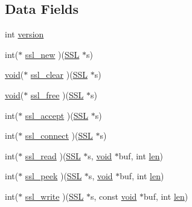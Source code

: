 \subsection*{Data Fields}
\begin{DoxyCompactItemize}
\item 
int \hyperlink{structssl__method__st_aad880fc4455c253781e8968f2239d56f}{version}
\item 
int($\ast$ \hyperlink{structssl__method__st_af01b1a29fdeb66e611dca725caecdfcd}{ssl\+\_\+new} )(\hyperlink{crypto_2ossl__typ_8h_a71f21e09bf365489dab9d85bd4785e24}{S\+SL} $\ast$s)
\item 
\hyperlink{hw__4758__cca_8h_afad4d591c7931ff6dc5bf69c76c96aa0}{void}($\ast$ \hyperlink{structssl__method__st_a8dc478efd0c1ebad9a7da93c749168af}{ssl\+\_\+clear} )(\hyperlink{crypto_2ossl__typ_8h_a71f21e09bf365489dab9d85bd4785e24}{S\+SL} $\ast$s)
\item 
\hyperlink{hw__4758__cca_8h_afad4d591c7931ff6dc5bf69c76c96aa0}{void}($\ast$ \hyperlink{structssl__method__st_a1041c3805ac6cba5adaf5c4cc34e7b6e}{ssl\+\_\+free} )(\hyperlink{crypto_2ossl__typ_8h_a71f21e09bf365489dab9d85bd4785e24}{S\+SL} $\ast$s)
\item 
int($\ast$ \hyperlink{structssl__method__st_ae3e4f0a3a9378f4f26312e12318c476f}{ssl\+\_\+accept} )(\hyperlink{crypto_2ossl__typ_8h_a71f21e09bf365489dab9d85bd4785e24}{S\+SL} $\ast$s)
\item 
int($\ast$ \hyperlink{structssl__method__st_ab1428f6ea062364ac8b5e3ef46037539}{ssl\+\_\+connect} )(\hyperlink{crypto_2ossl__typ_8h_a71f21e09bf365489dab9d85bd4785e24}{S\+SL} $\ast$s)
\item 
int($\ast$ \hyperlink{structssl__method__st_a08b6155a38ff9a92d129ee5714fcc106}{ssl\+\_\+read} )(\hyperlink{crypto_2ossl__typ_8h_a71f21e09bf365489dab9d85bd4785e24}{S\+SL} $\ast$s, \hyperlink{hw__4758__cca_8h_afad4d591c7931ff6dc5bf69c76c96aa0}{void} $\ast$buf, int \hyperlink{include_2openssl_2x509_8h_ad8c3db4434e9cb5cd772cc009f40e856}{len})
\item 
int($\ast$ \hyperlink{structssl__method__st_ae0f55e38529bb5894dcec9ff19e9b04d}{ssl\+\_\+peek} )(\hyperlink{crypto_2ossl__typ_8h_a71f21e09bf365489dab9d85bd4785e24}{S\+SL} $\ast$s, \hyperlink{hw__4758__cca_8h_afad4d591c7931ff6dc5bf69c76c96aa0}{void} $\ast$buf, int \hyperlink{include_2openssl_2x509_8h_ad8c3db4434e9cb5cd772cc009f40e856}{len})
\item 
int($\ast$ \hyperlink{structssl__method__st_a7d53f3c773121d96d1653052bf263f84}{ssl\+\_\+write} )(\hyperlink{crypto_2ossl__typ_8h_a71f21e09bf365489dab9d85bd4785e24}{S\+SL} $\ast$s, const \hyperlink{hw__4758__cca_8h_afad4d591c7931ff6dc5bf69c76c96aa0}{void} $\ast$buf, int \hyperlink{include_2openssl_2x509_8h_ad8c3db4434e9cb5cd772cc009f40e856}{len})

\end{DoxyCompactItemize}
